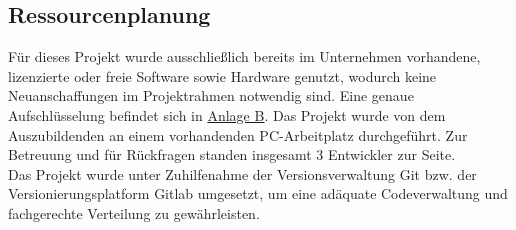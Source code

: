 \subsection{Ressourcenplanung}
    Für dieses Projekt wurde ausschließlich bereits im Unternehmen vorhandene, lizenzierte oder freie Software sowie Hardware genutzt, wodurch keine Neuanschaffungen im Projektrahmen notwendig sind. Eine genaue Aufschlüsselung befindet sich in \hyperref[anlage:ressourcen]{Anlage B}. Das Projekt wurde von dem Auszubildenden an einem vorhandenden PC-Arbeitplatz durchgeführt. Zur Betreuung und für Rückfragen standen insgesamt 3 Entwickler zur Seite.\\
    Das Projekt wurde unter Zuhilfenahme der Versionsverwaltung Git bzw. der Versionierungsplatform Gitlab umgesetzt, um eine adäquate Codeverwaltung und fachgerechte Verteilung zu gewährleisten.

\vfill